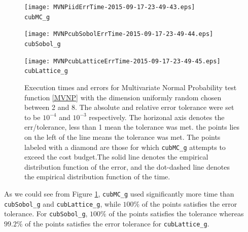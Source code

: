 \documentclass{iitthesis}
\begin{document}
\begin{figure}
\centering
\begin{minipage}{9cm} \centering \texttt{[image: MVNPiidErrTime-2015-09-17-23-49-43.eps]} \\ {\tt cubMC\_g}  \end{minipage}
\begin{minipage}{7cm} \centering \texttt{[image: MVNPcubSobolErrTime-2015-09-17-23-49-44.eps]} \\  {\tt cubSobol\_g}\end{minipage}
\begin{minipage}{7cm} \centering \texttt{[image: MVNPcubLatticeErrTime-2015-09-17-23-49-45.eps]} \\ {\tt cubLattice\_g} \end{minipage}
\caption{Execution times and errors for Multivariate Normal Probability test function \eqref{MVNP} with the dimension uniformly random chosen between 2 and 8. The absolute and relative error tolerance were set to be $10^{-4}$ and $10^{-3}$ respectively. The horizonal axis denotes the err/tolerance, less than 1 mean the tolerance was met. the points lies on the left of the line means the tolerance was met. The points labeled with a diamond are those for which  {\tt cubMC\_g}  attempts to exceed the cost budget.The solid line denotes the empirical distribution function of the error, and the dot-dashed line denotes the empirical distribution function of the time.\label{fig:MVNPTestFun1} }
\end{figure}
As we could see from Figure \ref{fig:MVNPTestFun1}, {\tt cubMC\_g} used significantly more time than {\tt cubSobol\_g} and {\tt cubLattice\_g}, while $100\%$ of the points satisfies the error tolerance. For {\tt cubSobol\_g}, $100\%$ of the points satisfies the tolerance whereas $99.2\%$ of the points satisfies the error tolerance for {\tt cubLattice\_g}.


%
\end{document}
